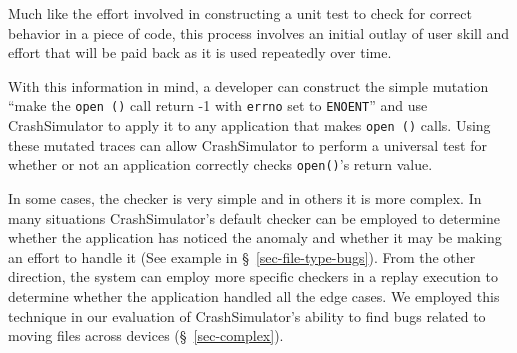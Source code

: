     Much like the effort involved in constructing a unit test to
    check for correct behavior in a piece of code, this
    process involves an initial outlay of user skill and effort that 
    will be paid back as it is used
    repeatedly over time.

    With this information in mind, a developer can construct the simple
    mutation ``make the {\tt open ()} call return -1 with {\tt errno} set to
    {\tt ENOENT}'' and use CrashSimulator to apply it to any application that
    makes {\tt open ()} calls.  Using these mutated traces can allow
    CrashSimulator to perform a universal test for whether or not an
    application correctly checks {\tt open()}'s return value.


    In some cases, %
    the checker is very simple and in others it is more complex.
   In many situations
    CrashSimulator's default checker can be employed to determine
    whether the application has noticed the anomaly and whether it may be making
    an effort to handle it (See example in
    \S~\ref{sec-file-type-bugs}).  From the other direction,
    the system can employ more specific checkers in a replay execution 
    to determine whether the application handled
    all the edge cases.  We employed this technique in our
    evaluation of CrashSimulator's ability to find bugs related to moving files across
    devices (\S~\ref{sec-complex}).
    
